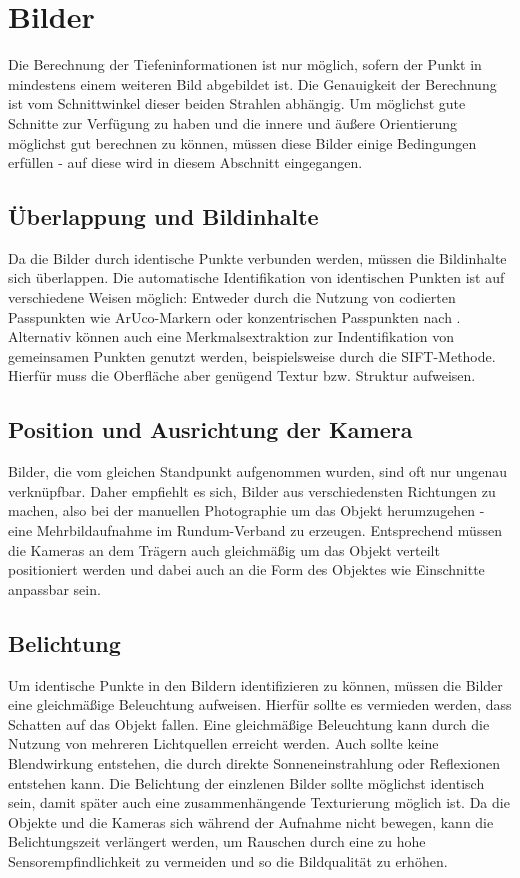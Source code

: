 \documentclass[./00PhotoBox.tex]{subfiles}
\begin{document}
\section{Bilder}
\label{s:bilder}

Die Berechnung der Tiefeninformationen ist nur möglich, sofern der Punkt in mindestens einem weiteren Bild abgebildet ist. Die Genauigkeit der Berechnung ist vom Schnittwinkel dieser beiden Strahlen abhängig. Um möglichst gute Schnitte zur Ver\-fügung zu haben und die innere und äußere Orientierung möglichst gut berechnen zu können, müssen diese Bilder einige Bedingungen erfüllen - auf diese wird in diesem Abschnitt eingegangen.

\subsection{Überlappung und Bildinhalte}
Da die Bilder durch identische Punkte verbunden werden, müssen die Bildinhalte sich überlappen. Die automatische Identifikation von identischen Punkten ist auf verschiedene Weisen möglich: Entweder durch die Nutzung von codierten Passpunkten wie ArUco-Markern oder konzentrischen Passpunkten nach \cite{schneider}. Alternativ können auch eine Merkmalsextraktion zur Indentifikation von gemeinsamen Punkten genutzt werden, beispielsweise durch die SIFT-Methode. Hierfür muss die Oberfläche aber genügend Textur bzw. Struktur aufweisen. \citep[S. 478]{luhmann}

\subsection{Position und Ausrichtung der Kamera}
Bilder, die vom gleichen Standpunkt aufgenommen wurden, sind oft nur ungenau verknüpfbar. Daher empfiehlt es sich, Bilder aus verschiedensten Richtungen zu machen, also bei der manuellen Photographie um das Objekt herumzugehen - eine Mehrbildaufnahme im Rundum-Verband zu erzeugen. \citep[S. 170]{luhmann}
Entsprechend müssen die Kameras an dem Trägern auch gleichmäßig um das Objekt verteilt positioniert werden und dabei auch an die Form des Objektes wie Einschnitte anpassbar sein.

\subsection{Belichtung}
Um identische Punkte in den Bildern identifizieren zu können, müssen die Bilder eine gleichmäßige Beleuchtung aufweisen. Hierfür sollte es vermieden werden, dass Schatten auf das Objekt fallen. Eine gleichmäßige Beleuchtung kann durch die Nutzung von mehreren Lichtquellen erreicht werden. Auch sollte keine Blendwirkung entstehen, die durch direkte Sonneneinstrahlung oder Reflexionen entstehen kann. Die Belichtung der einzlenen Bilder sollte möglichst identisch sein, damit später auch eine zusammenhängende Texturierung möglich ist.
Da die Objekte und die Kameras sich während der Aufnahme nicht bewegen, kann die Belichtungszeit verlängert werden, um Rauschen durch eine zu hohe Sensorempfindlichkeit zu vermeiden und so die Bildqualität zu erhöhen.
\end{document}
